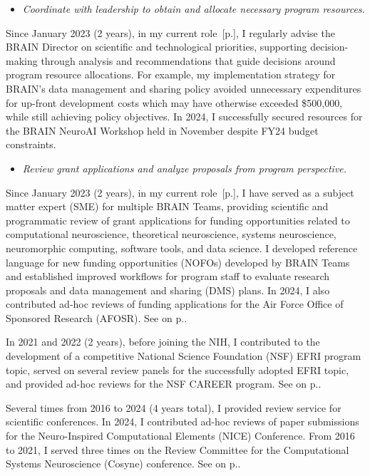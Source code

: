 \documentclass[10pt]{article}
\newcommand{\see}[1]{[\textcolor{hopkinsblue}{p.\pageref{sec:#1}}]}
\newcommand{\cf}[1]{\textcolor{hopkinsblue}{See \emph{\nameref{sec:#1}} on p.\pageref{sec:#1}}}
\begin{document}
\begin{itemize}
  \color{hopkinsblue}
  \item \emph{Coordinate with leadership to obtain and allocate necessary
program resources.}
\end{itemize}

Since January 2023 (2 years), in my current role~\see{jobobd}, I regularly
advise the BRAIN Director on scientific and technological priorities, supporting
decision-making through analysis and recommendations that guide decisions around
program resource allocations. For example, my implementation strategy for
BRAIN's data management and sharing policy avoided unnecessary expenditures for
up-front development costs which may have otherwise exceeded \$500,000, while
still achieving policy objectives. In 2024, I successfully secured resources for
the BRAIN NeuroAI Workshop held in November despite FY24 budget constraints.

\begin{itemize}
  \color{hopkinsblue}
  \item \emph{Review grant applications and analyze proposals from program
perspective.}
\end{itemize}

Since January 2023 (2 years), in my current role~\see{jobobd}, I have served as
a subject matter expert (SME) for multiple BRAIN Teams, providing scientific
and programmatic review of grant applications for funding opportunities related
to computational neuroscience, theoretical neuroscience, systems neuroscience,
neuromorphic computing, software tools, and data science. I developed reference
language for new funding opportunities (NOFOs) developed by BRAIN Teams and
established improved workflows for program staff to evaluate research proposals
and data management and sharing (DMS) plans. In 2024, I also contributed ad-hoc
reviews of funding applications for the Air Force Office of Sponsored Research
(AFOSR). \cf{service}.

In 2021 and 2022 (2 years), before joining the NIH, I contributed to the
development of a competitive National Science Foundation (NSF) EFRI program
topic, served on several review panels for the successfully adopted EFRI topic,
and provided ad-hoc reviews for the NSF CAREER program. \cf{programsvc}.

Several times from 2016 to 2024 (4 years total), I provided review service
for scientific conferences. In 2024, I contributed ad-hoc reviews of paper
submissions for the Neuro-Inspired Computational Elements (NICE) Conference.
From 2016 to 2021, I served three times on the Review Committee for the
Computational Systems Neuroscience (Cosyne) conference. \cf{confsvc}.
\end{document}
